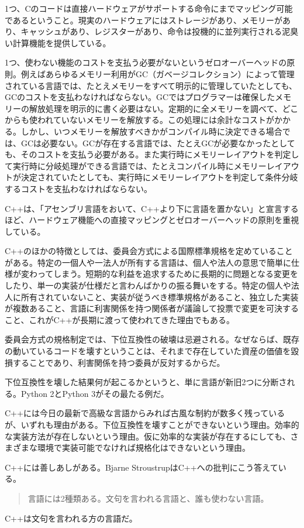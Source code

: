 1つ、Cのコードは直接ハードウェアがサポートする命令にまでマッピング可能であるということ。現実のハードウェアにはストレージがあり、メモリーがあり、キャッシュがあり、レジスターがあり、命令は投機的に並列実行される泥臭い計算機能を提供している。

1つ、使わない機能のコストを支払う必要がないというゼロオーバーヘッドの原則。例えばあらゆるメモリー利用がGC（ガベージコレクション）によって管理されている言語では、たとえメモリーをすべて明示的に管理していたとしても、GCのコストを支払わなければならない。GCではプログラマーは確保したメモリーの解放処理を明示的に書く必要はない。定期的に全メモリーを調べて、どこからも使われていないメモリーを解放する。この処理には余計なコストがかかる。しかし、いつメモリーを解放すべきかがコンパイル時に決定できる場合では、GCは必要ない。GCが存在する言語では、たとえGCが必要なかったとしても、そのコストを支払う必要がある。また実行時にメモリーレイアウトを判定して実行時に分岐処理ができる言語では、たとえコンパイル時にメモリーレイアウトが決定されていたとしても、実行時にメモリーレイアウトを判定して条件分岐するコストを支払わなければならない。

C++は、「アセンブリ言語をおいて、C++より下に言語を置かない」と宣言するほど、ハードウェア機能への直接マッピングとゼロオーバーヘッドの原則を重視している。

C++のほかの特徴としては、委員会方式による国際標準規格を定めていることがある。特定の一個人や一法人が所有する言語は、個人や法人の意思で簡単に仕様が変わってしまう。短期的な利益を追求するために長期的に問題となる変更をしたり、単一の実装が仕様だと言わんばかりの振る舞いをする。特定の個人や法人に所有されていないこと、実装が従うべき標準規格があること、独立した実装が複数あること、言語に利害関係を持つ関係者が議論して投票で変更を可決すること、これがC++が長期に渡って使われてきた理由でもある。

委員会方式の規格制定では、下位互換性の破壊は忌避される。なぜならば、既存の動いているコードを壊すということは、それまで存在していた資産の価値を毀損することであり、利害関係を持つ委員が反対するからだ。

下位互換性を壊した結果何が起こるかというと、単に言語が新旧2つに分断される。Python 2とPython 3がその最たる例だ。

C++には今日の最新で高級な言語からみれば古風な制約が数多く残っているが、いずれも理由がある。下位互換性を壊すことができないという理由。効率的な実装方法が存在しないという理由。仮に効率的な実装が存在するにしても、さまざまな環境で実装可能でなければ規格化はできないという理由。

C++には善しあしがある。Bjarne StroustrupはC++への批判にこう答えている。

\begin{quote}
言語には2種類ある。文句を言われる言語と、誰も使わない言語。
\end{quote}

C++は文句を言われる方の言語だ。
